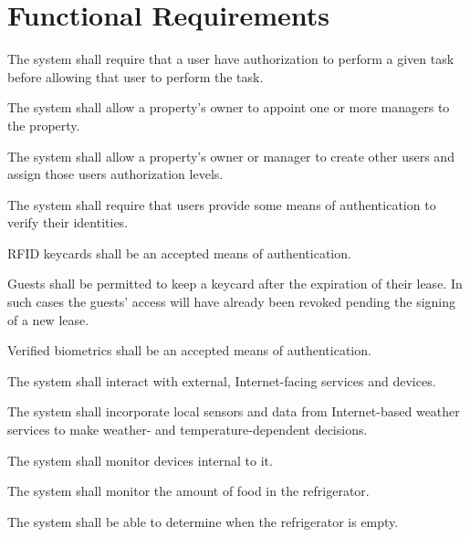 \documentclass[letter,titlepage,oneside,english]{report}
\begin{document}
\section*{Functional Requirements}
\begin{fr}
\item
  The system shall require that a user have authorization to perform a given task before allowing that user to perform the task.
  \begin{fr}
  \item
    The system shall allow a property's owner to appoint one or more managers to the property.
  \item
    The system shall allow a property's owner or manager to create other users and assign those users authorization levels.
  \item
    The system shall require that users provide some means of authentication to verify their identities.
    \begin{fr}
    \item
      RFID keycards shall be an accepted means of authentication.
      \begin{fr}
      \item
        Guests shall be permitted to keep a keycard after the expiration of their lease.
        In such cases the guests' access will have already been revoked pending the signing of a new lease.
      \end{fr}
    \item
      Verified biometrics shall be an accepted means of authentication.
    \end{fr}
  \end{fr}
\item
  The system shall interact with external, Internet-facing services and devices.
  \begin{fr}
  \item\label{fr:external:weather}
    The system shall incorporate local sensors and data from Internet-based weather services to make weather- and temperature-dependent decisions.
  \end{fr}
\item
  The system shall monitor devices internal to it.
  \begin{fr}
  \item
    The system shall monitor the amount of food in the refrigerator.
    \begin{fr}
    \item
      The system shall be able to determine when the refrigerator is empty.

\end{fr}
\end{fr}
\end{fr}
\end{document}
